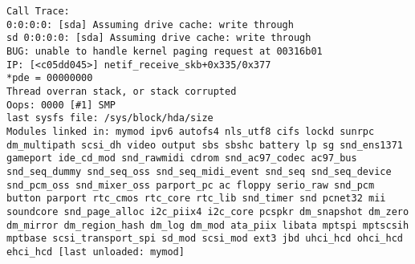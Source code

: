 \begin{lstlisting}
Call Trace:
0:0:0:0: [sda] Assuming drive cache: write through
sd 0:0:0:0: [sda] Assuming drive cache: write through
BUG: unable to handle kernel paging request at 00316b01
IP: [<c05dd045>] netif_receive_skb+0x335/0x377
*pde = 00000000
Thread overran stack, or stack corrupted
Oops: 0000 [#1] SMP
last sysfs file: /sys/block/hda/size
Modules linked in: mymod ipv6 autofs4 nls_utf8 cifs lockd sunrpc 
dm_multipath scsi_dh video output sbs sbshc battery lp sg snd_ens1371 
gameport ide_cd_mod snd_rawmidi cdrom snd_ac97_codec ac97_bus 
snd_seq_dummy snd_seq_oss snd_seq_midi_event snd_seq snd_seq_device 
snd_pcm_oss snd_mixer_oss parport_pc ac floppy serio_raw snd_pcm 
button parport rtc_cmos rtc_core rtc_lib snd_timer snd pcnet32 mii 
soundcore snd_page_alloc i2c_piix4 i2c_core pcspkr dm_snapshot dm_zero
dm_mirror dm_region_hash dm_log dm_mod ata_piix libata mptspi mptscsih
mptbase scsi_transport_spi sd_mod scsi_mod ext3 jbd uhci_hcd ohci_hcd 
ehci_hcd [last unloaded: mymod]


\end{lstlisting}
